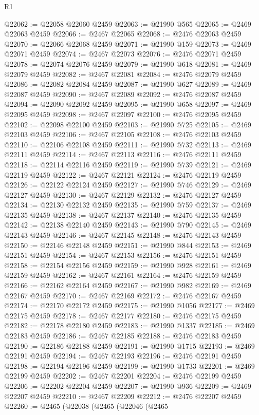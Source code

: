 \begin{lexlean}{R1}
\begin{coremodule}
@22062 := @22058 @22060 @2459
@22063 := @21990 @565
@22065 := @2469 @22063 @2459
@22066 := @2467 @22065
@22068 := @2476 @22063 @2459
@22070 := @22066 @22068 @2459
@22071 := @21990 @159
@22073 := @2469 @22071 @2459
@22074 := @2467 @22073
@22076 := @2476 @22071 @2459
@22078 := @22074 @22076 @2459
@22079 := @21990 @618
@22081 := @2469 @22079 @2459
@22082 := @2467 @22081
@22084 := @2476 @22079 @2459
@22086 := @22082 @22084 @2459
@22087 := @21990 @627
@22089 := @2469 @22087 @2459
@22090 := @2467 @22089
@22092 := @2476 @22087 @2459
@22094 := @22090 @22092 @2459
@22095 := @21990 @658
@22097 := @2469 @22095 @2459
@22098 := @2467 @22097
@22100 := @2476 @22095 @2459
@22102 := @22098 @22100 @2459
@22103 := @21990 @725
@22105 := @2469 @22103 @2459
@22106 := @2467 @22105
@22108 := @2476 @22103 @2459
@22110 := @22106 @22108 @2459
@22111 := @21990 @732
@22113 := @2469 @22111 @2459
@22114 := @2467 @22113
@22116 := @2476 @22111 @2459
@22118 := @22114 @22116 @2459
@22119 := @21990 @739
@22121 := @2469 @22119 @2459
@22122 := @2467 @22121
@22124 := @2476 @22119 @2459
@22126 := @22122 @22124 @2459
@22127 := @21990 @746
@22129 := @2469 @22127 @2459
@22130 := @2467 @22129
@22132 := @2476 @22127 @2459
@22134 := @22130 @22132 @2459
@22135 := @21990 @759
@22137 := @2469 @22135 @2459
@22138 := @2467 @22137
@22140 := @2476 @22135 @2459
@22142 := @22138 @22140 @2459
@22143 := @21990 @790
@22145 := @2469 @22143 @2459
@22146 := @2467 @22145
@22148 := @2476 @22143 @2459
@22150 := @22146 @22148 @2459
@22151 := @21990 @844
@22153 := @2469 @22151 @2459
@22154 := @2467 @22153
@22156 := @2476 @22151 @2459
@22158 := @22154 @22156 @2459
@22159 := @21990 @928
@22161 := @2469 @22159 @2459
@22162 := @2467 @22161
@22164 := @2476 @22159 @2459
@22166 := @22162 @22164 @2459
@22167 := @21990 @982
@22169 := @2469 @22167 @2459
@22170 := @2467 @22169
@22172 := @2476 @22167 @2459
@22174 := @22170 @22172 @2459
@22175 := @21990 @1056
@22177 := @2469 @22175 @2459
@22178 := @2467 @22177
@22180 := @2476 @22175 @2459
@22182 := @22178 @22180 @2459
@22183 := @21990 @1337
@22185 := @2469 @22183 @2459
@22186 := @2467 @22185
@22188 := @2476 @22183 @2459
@22190 := @22186 @22188 @2459
@22191 := @21990 @1715
@22193 := @2469 @22191 @2459
@22194 := @2467 @22193
@22196 := @2476 @22191 @2459
@22198 := @22194 @22196 @2459
@22199 := @21990 @1733
@22201 := @2469 @22199 @2459
@22202 := @2467 @22201
@22204 := @2476 @22199 @2459
@22206 := @22202 @22204 @2459
@22207 := @21990 @936
@22209 := @2469 @22207 @2459
@22210 := @2467 @22209
@22212 := @2476 @22207 @2459
@22260 := @2465
    (@22038
      (@2465
        (@22046
          (@2465

\end{coremodule}
\end{lexlean}

